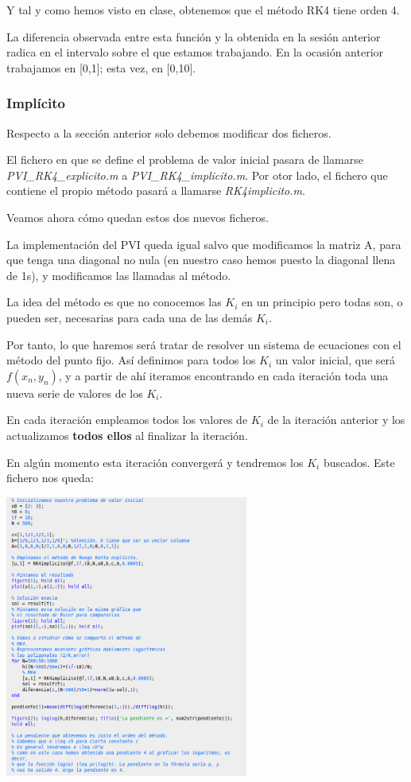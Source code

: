 Y tal y como hemos visto en clase, obtenemos que el método RK4 tiene orden 4.

\obs La diferencia observada entre esta función y la obtenida en la sesión anterior radica en el intervalo sobre el que estamos trabajando. En la ocasión anterior trabajamos en [0,1]; esta vez, en [0,10].

\subsubsection{Implícito}
Respecto a la sección anterior solo debemos modificar dos ficheros.

El fichero en que se define el problema de valor inicial pasara de llamarse \textit{PVI\_RK4\_explicito.m} a \textit{PVI\_RK4\_implicito.m}. Por otor lado, el fichero que contiene el propio método pasará a llamarse \textit{RK4implicito.m}. 

Veamos ahora cómo quedan estos dos nuevos ficheros.

La implementación del PVI queda igual salvo que modificamos la matriz A, para que tenga una diagonal no nula (en nuestro caso hemos puesto la diagonal llena de 1s), y modificamos las llamadas al método. 

La idea del método es que no conocemos las $K_i$ en un principio pero todas son, o pueden ser, necesarias para cada una de las demás $K_i$. 

Por tanto, lo que haremos será tratar de resolver un sistema de ecuaciones con el método del punto fijo. Así definimos para todos los $K_i$ un valor inicial, que será $f(x_n,y_n)$, y a partir de ahí iteramos encontrando en cada iteración toda una nueva serie de valores de los $K_i$.

En cada iteración empleamos todos los valores de $K_i$ de la iteración anterior y los actualizamos \textbf{todos ellos} al finalizar la iteración.

En algún momento esta iteración convergerá y tendremos los $K_i$ buscados.
Este fichero nos queda:

\begin{center}
\includegraphics[width=0.6\textwidth]{img/PVI_RK4_implicito.png}
\end{center}


